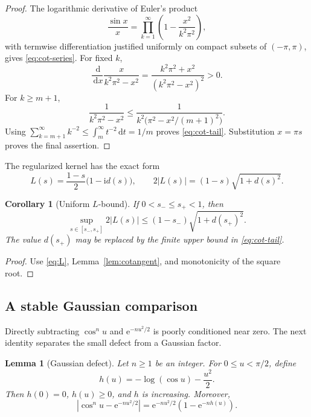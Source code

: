 \documentclass[11pt,a4paper,twoside]{article}
\newcommand{\manualtag}[1]{\tag{#1}}
\newtheorem{lemma}[theorem]{Lemma}
\newtheorem{corollary}[theorem]{Corollary}
\theoremstyle{remark}
\newcommand{\iu}{\mathrm{i}}
\newcommand{\e}{\mathrm{e}}
\newcommand{\dd}{\,\mathrm{d}}
\newcommand{\abs}[1]{\lvert#1\rvert}
\begin{document}
\begin{proof}
The logarithmic derivative of Euler's product
\[
 \frac{\sin x}{x}
 =
 \prod_{k=1}^{\infty}
 \left(1-\frac{x^2}{k^2\pi^2}\right),
\]
with termwise differentiation justified uniformly on compact subsets of
\((-\pi,\pi)\), gives \eqref{eq:cot-series}.  For fixed \(k\),
\[
 \frac{\dd}{\dd x}
 \frac{x}{k^2\pi^2-x^2}
 =
 \frac{k^2\pi^2+x^2}{(k^2\pi^2-x^2)^2}>0.
\]
For \(k\ge m+1\),
\[
 \frac1{k^2\pi^2-x^2}
 \le
 \frac1{k^2\bigl(\pi^2-x^2/(m+1)^2\bigr)}.
\]
Using
\(\sum_{k=m+1}^{\infty}k^{-2}\le\int_m^\infty t^{-2}\dd t=1/m\)
proves \eqref{eq:cot-tail}.  Substitution \(x=\pi s\) proves the
final assertion.
\end{proof}

The regularized kernel has the exact form
\begin{equation}
 L(s)
 =
 \frac{1-s}{2}\bigl(1-\iu d(s)\bigr),
 \qquad
 2\abs{L(s)}
 =
 (1-s)\sqrt{1+d(s)^2}.
 \manualtag{24}\label{eq:L}
\end{equation}

\begin{corollary}[Uniform \(L\)-bound]\label{cor:L-bound}
If \(0<s_-\le s_+<1\), then
\begin{equation}
 \sup_{s\in[s_-,s_+]}2\abs{L(s)}
 \le
 (1-s_-)\sqrt{1+d(s_+)^2}.
 \manualtag{25}\label{eq:L-bound}
\end{equation}
The value \(d(s_+)\) may be replaced by the finite upper bound
in \eqref{eq:cot-tail}.
\end{corollary}

\begin{proof}
Use \eqref{eq:L}, Lemma~\ref{lem:cotangent}, and monotonicity of the
square root.
\end{proof}

\subsection{A stable Gaussian comparison}

Directly subtracting \(\cos^n u\) and \(\e^{-nu^2/2}\) is poorly
conditioned near zero.  The next identity separates the small defect from a
Gaussian factor.

\begin{lemma}[Gaussian defect]\label{lem:gaussian-defect}
Let \(n\ge1\) be an integer.  For \(0\le u<\pi/2\), define
\begin{equation}
 h(u)=-\log(\cos u)-\frac{u^2}{2}.
 \manualtag{26}\label{eq:h}
\end{equation}
Then \(h(0)=0\), \(h(u)\ge0\), and \(h\) is increasing.  Moreover,
\begin{equation}
 \left|\cos^n u-\e^{-nu^2/2}\right|
 =
 \e^{-nu^2/2}\left(1-\e^{-nh(u)}\right).
 \manualtag{27}\label{eq:gaussian-defect}
\end{equation}
\end{lemma}
\end{document}
